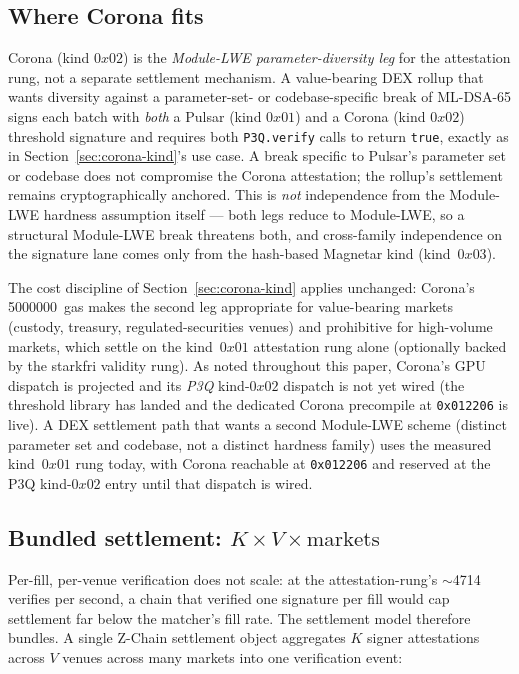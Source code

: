 \subsection{Where Corona fits}

Corona (kind $0x02$) is the \emph{Module-LWE parameter-diversity leg}
for the attestation rung, not a separate settlement mechanism. A
value-bearing DEX rollup that wants diversity against a
parameter-set- or codebase-specific break of ML-DSA-65 signs each batch
with \emph{both} a Pulsar (kind $0x01$) and a Corona (kind $0x02$)
threshold signature and requires both \texttt{P3Q.verify} calls to
return \texttt{true}, exactly as in Section~\ref{sec:corona-kind}'s use
case. A break specific to Pulsar's parameter set or codebase does not
compromise the Corona attestation; the rollup's settlement remains
cryptographically anchored. This is \emph{not} independence from the
Module-LWE hardness assumption itself --- both legs reduce to
Module-LWE, so a structural Module-LWE break threatens both, and
cross-family independence on the signature lane comes only from the
hash-based Magnetar kind (kind~$0x03$).

The cost discipline of Section~\ref{sec:corona-kind} applies unchanged:
Corona's \SI{5000000}{gas} makes the second leg appropriate for
value-bearing markets (custody, treasury, regulated-securities venues)
and prohibitive for high-volume markets, which settle on the kind~$0x01$
attestation rung alone (optionally backed by the starkfri validity rung).
As noted throughout this paper, Corona's GPU dispatch is projected and
its \emph{P3Q} kind-$0x02$ dispatch is not yet wired (the threshold
library has landed and the dedicated Corona precompile at \texttt{0x012206}
is live). A DEX settlement path that wants a second Module-LWE scheme
(distinct parameter set and codebase, not a distinct hardness family)
uses the measured kind~$0x01$ rung today, with Corona reachable at
\texttt{0x012206} and reserved at the P3Q kind-$0x02$ entry until that
dispatch is wired.

\subsection{Bundled settlement: $K \times V \times \text{markets}$}

Per-fill, per-venue verification does not scale: at the
attestation-rung's $\sim$\num{4714} verifies per second, a chain that
verified one signature per fill would cap settlement far below the
matcher's fill rate. The settlement model therefore bundles. A single
Z-Chain settlement object aggregates $K$ signer attestations across $V$
venues across many markets into one verification event:

